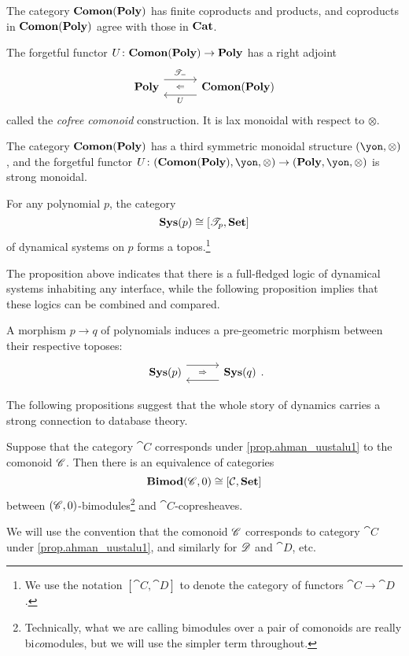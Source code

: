 \documentclass[Book-Poly]{subfiles}
\begin{document}
\begin{proposition}
The category $\mathbf{Comon}(\mathbf{Poly})$ has finite coproducts and products, and coproducts in $\mathbf{Comon}(\mathbf{Poly})$ agree with those in $\mathbf{Cat}$.
\end{proposition}

\begin{proposition}
The forgetful functor $U\colon\mathbf{Comon}(\mathbf{Poly})\to\mathbf{Poly}$ has a right adjoint
\[
\adjr{\poly}{\cofree{-}}{U}{\comon(\poly)}
\]
called the \emph{cofree comonoid} construction. It is lax monoidal with respect to $\otimes$.
\end{proposition}

\begin{proposition}
The category $\mathbf{Comon}(\mathbf{Poly})$ has a third symmetric monoidal structure $(\yon,\otimes)$, and the forgetful functor $U\colon(\comon(\poly),\yon,\otimes)\to(\poly,\yon,\otimes)$ is strong monoidal.
\end{proposition}

\begin{proposition}\label{prop.sysp[i]s_topos}
For any polynomial $p$, the category
\[\mathbf{Sys}(p)\cong[\mathscr{T}_{p},\mathbf{Set}]\]
of dynamical systems on $p$ forms a topos.\footnote{We use the notation $[\cat{C}, \cat{D}]$ to denote the category of functors $\cat{C}\to\cat{D}$.}
\end{proposition}

The proposition above indicates that there is a full-fledged logic of dynamical systems inhabiting any interface, while the following proposition implies that these logics can be combined and compared.

\begin{proposition}\label{prop.poly_map_pregeo_topos}
A morphism $p\to q$ of polynomials induces a pre-geometric morphism between their respective toposes:
\[
\adj{\sys(p)}{}{}{\sys(q)}.
\]
\end{proposition}

The following propositions suggest that the whole story of dynamics carries a strong connection to database theory.

\begin{proposition}
Suppose that the category $\cat{C}$ corresponds under \cref{prop.ahman_uustalu1} to the comonoid $\mathscr{C}$. Then there is an equivalence of categories
\[
\mathbf{Bimod}(\mathscr{C},0)\cong[\mathcal{C},\mathbf{Set}]
\]
between $(\mathscr{C},0)$-bimodules\footnote{Technically, what we are calling bimodules over a pair of comonoids are really bi\emph{co}modules, but we will use the simpler term throughout.} and $\cat{C}$-copresheaves.
\end{proposition}
We will use the convention that the comonoid $\mathscr{C}$ corresponds to category $\cat{C}$ under \cref{prop.ahman_uustalu1}, and similarly for $\mathscr{D}$ and $\cat{D}$, etc. 
\end{document}
